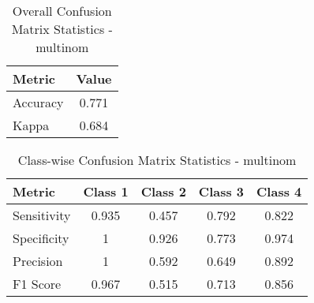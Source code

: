 \begin{table}[h]
\centering
\begin{tabular}{l|c}
Metric & Value \\ \hline
Accuracy & 0.771 \\
Kappa & 0.684 \\
\end{tabular}
\caption{Overall Confusion Matrix Statistics - multinom }
\end{table}

\begin{table}[h]
\centering
\begin{tabular}{l|c|c|c|c}
Metric & Class 1 & Class 2 & Class 3 & Class 4 \\ \hline
Sensitivity & 0.935 & 0.457 & 0.792 & 0.822 \\
Specificity & 1 & 0.926 & 0.773 & 0.974 \\
Precision & 1 & 0.592 & 0.649 & 0.892 \\
F1 Score & 0.967 & 0.515 & 0.713 & 0.856 \\
\end{tabular}
\caption{Class-wise Confusion Matrix Statistics - multinom }
\end{table}
